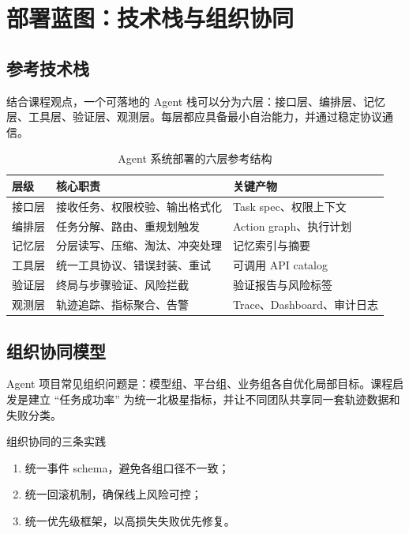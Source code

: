 \section{部署蓝图：技术栈与组织协同}

\subsection{参考技术栈}
结合课程观点，一个可落地的 Agent 栈可以分为六层：接口层、编排层、记忆层、工具层、验证层、观测层。每层都应具备最小自治能力，并通过稳定协议通信。

\begin{table}[H]
\centering
\begin{tabular}{p{2.4cm}p{4.0cm}p{4.6cm}}
\toprule
\textbf{层级} & \textbf{核心职责} & \textbf{关键产物} \\
\midrule
接口层 & 接收任务、权限校验、输出格式化 & Task spec、权限上下文 \\
编排层 & 任务分解、路由、重规划触发 & Action graph、执行计划 \\
记忆层 & 分层读写、压缩、淘汰、冲突处理 & 记忆索引与摘要 \\
工具层 & 统一工具协议、错误封装、重试 & 可调用 API catalog \\
验证层 & 终局与步骤验证、风险拦截 & 验证报告与风险标签 \\
观测层 & 轨迹追踪、指标聚合、告警 & Trace、Dashboard、审计日志 \\
\bottomrule
\end{tabular}
\caption{Agent 系统部署的六层参考结构}
\end{table}

\subsection{组织协同模型}
Agent 项目常见组织问题是：模型组、平台组、业务组各自优化局部目标。课程启发是建立 ``任务成功率'' 为统一北极星指标，并让不同团队共享同一套轨迹数据和失败分类。

\begin{importantbox}{组织协同的三条实践}
\begin{enumerate}
    \item 统一事件 schema，避免各组口径不一致；
    \item 统一回滚机制，确保线上风险可控；
    \item 统一优先级框架，以高损失失败优先修复。
\end{enumerate}
\end{importantbox}

